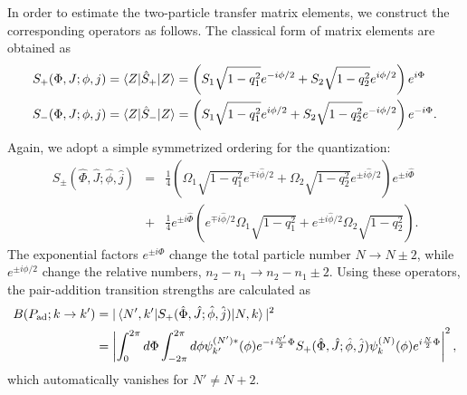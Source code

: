 \documentclass[%
superscriptaddress,
preprint,
showpacs,
nofootinbib,
amsmath,amssymb,
prc,
floatfix ]%
{revtex4-1}
\begin{document}
In order to estimate the two-particle transfer matrix elements,
we construct the corresponding operators as follows.
The classical form of matrix elements are obtained as
\begin{align}
  S_+(\Phi,J;\phi,j) &= \braket{Z|\hat{S}_+|Z} = \left( S_1\sqrt{1-q_1^2}e^{-i\phi/2}+S_2\sqrt{1-q_2^2}e^{i\phi/2} \right) e^{i\Phi}
	\label{Sp_mean_value} \\ 
  S_-(\Phi,J;\phi,j) &= \braket{Z|\hat{S}_-|Z} = \left( S_1\sqrt{1-q_1^2}e^{i\phi/2}+S_2\sqrt{1-q_2^2}e^{-i\phi/2} \right) e^{-i\Phi} .
	\label{Sm_mean_value}
\end{align}
Again, we adopt a simple symmetrized ordering for the quantization:
\begin{eqnarray}
  S_\pm (\hat{\Phi},\hat{J};\hat{\phi},\hat{j})
	&=& \frac{1}{4}\left( \Omega_1\sqrt{1-q_1^2}e^{\mp i\hat{\phi}/2}
+\Omega_2\sqrt{1-q_2^2}e^{\pm i\hat{\phi}/2} \right) e^{\pm i\hat{\Phi}} 
	\nonumber \\
&+ & \frac{1}{4}e^{\pm i\hat{\Phi}}\left( 
e^{\mp i\hat{\phi}/2}\Omega_1\sqrt{1-q_1^2}
+e^{\pm i\hat{\phi}/2}\Omega_2\sqrt{1-q_2^2} \right) .
\end{eqnarray}
The exponential factors $e^{\pm i\Phi}$ change
the total particle number $N\rightarrow N\pm 2$,
while $e^{\pm i\phi/2}$ change the relative numbers,
$n_2-n_1 \rightarrow n_2-n_1 \pm 2$.
Using these operators,
the pair-addition transition strengths are calculated as
\begin{align}
B(P_{\rm ad};k\rightarrow k') &=
|\braket{N',k'|S_+(\hat{\Phi},\hat{J};\hat{\phi},\hat{j})|N,k}|^2
	\nonumber \\
&= \left| \int_{0}^{2\pi}d\Phi \int_{-2\pi}^{2\pi}d\phi 
	\psi^{(N')*}_{k'}(\phi) e^{-i\frac{N'}{2}\Phi}
	S_+(\hat{\Phi},\hat{J};\hat{\phi},\hat{j})
	\psi^{(N)}_{k}(\phi)e^{i\frac{N}{2}\Phi} \right|^2,
\end{align}
which automatically vanishes for $N'\neq N+2$.
\end{document}
